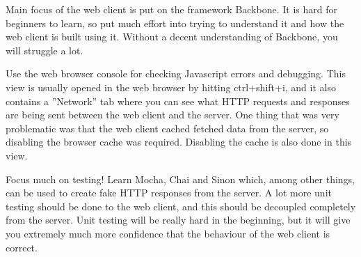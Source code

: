 Main focus of the web client is put on the framework Backbone. It is hard for beginners to learn, so put much effort into trying to understand it and how the web client is built using it. Without a decent understanding of Backbone, you will struggle a lot.

Use the web browser console for checking Javascript errors and debugging. This view is usually opened in the web browser by hitting ctrl+shift+i, and it also contains a ''Network'' tab where you can see what HTTP requests and responses are being sent between the web client and the server. One thing that was very problematic was that the web client cached fetched data from the server, so disabling the browser cache was required. Disabling the cache is also done in this view.

Focus much on testing! Learn Mocha, Chai and Sinon which, among other things, can be used to create fake HTTP responses from the server. A lot more unit testing should be done to the web client, and this should be decoupled completely from the server. Unit testing will be really hard in the beginning, but it will give you extremely much more confidence that the behaviour of the web client is correct.

